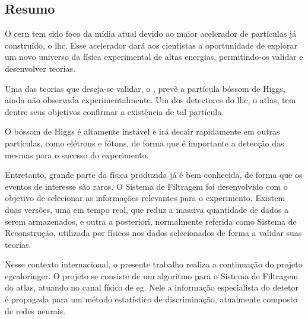 \vfill
\begin{center}
\section*{Resumo\label{Resumo}}
\end{center}

O \gls{cern} tem sido foco da mídia atual devido
ao maior acelerador de partículas já construído, o \gls{lhc}. Esse
acelerador dará aos cientistas a oportunidade de explorar um novo universo da física
experimental de altas energias, permitindo-os validar e desenvolver teorias.


Uma das teorias que deseja-se validar, o , prevê a partícula bóssom
de Higgs, ainda não observada experimentalmente. Um dos detectores do \gls{lhc}, o
\gls{atlas}, tem dentre seus objetivos confirmar a existência de tal partícula.

O bóssom de Higgs é altamente instável e irá decair rapidamente em outras
partículas, como elétrons e fótons, de forma que é importante a detecção das
mesmas para o sucesso do experimento.

Entretanto, grande parte da física produzida já é bem conhecida, de forma que 
os eventos de interesse são raros. O Sistema de Filtragem foi desenvolvido
com o objetivo de selecionar as informações relevantes para o experimento.
Existem duas versões, uma em tempo real, que reduz a massiva quantidade de dados
a serem armazenados, e outra a posteriori, normalmente referida como Sistema de
Reconstrução, utilizada por físicos nos dados selecionados de forma a validar suas teorias.


Nesse contexto internacional, o presente trabalho realiza a continuação
do projeto \acrshort{egcaloringer}. 
O projeto se consiste de um algoritmo 
para o Sistema de Filtragem do \gls{atlas}, atuando no canal físico de
\acrshort{eg}. Nele a informação especialista do detetor é propagada para um
método estatístico de discriminação, atualmente composto de redes neurais.


